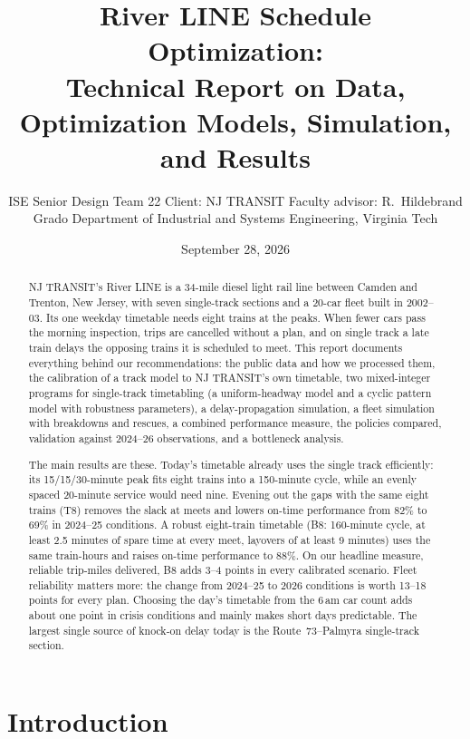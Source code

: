 \documentclass[11pt]{article}
\title{River LINE Schedule Optimization:\\
\large Technical Report on Data, Optimization Models, Simulation, and Results}
\author{ISE Senior Design Team 22 \quad Client: NJ TRANSIT \quad Faculty advisor: R.~Hildebrand\\
Grado Department of Industrial and Systems Engineering, Virginia Tech}
\date{September 28, 2026}
\begin{document}
\maketitle

\begin{abstract}
NJ TRANSIT's River LINE is a 34-mile diesel light rail line between Camden and Trenton, New Jersey, with seven single-track sections and a 20-car fleet built in 2002--03. Its one weekday timetable needs eight trains at the peaks. When fewer cars pass the morning inspection, trips are cancelled without a plan, and on single track a late train delays the opposing trains it is scheduled to meet. This report documents everything behind our recommendations: the public data and how we processed them, the calibration of a track model to NJ TRANSIT's own timetable, two mixed-integer programs for single-track timetabling (a uniform-headway model and a cyclic pattern model with robustness parameters), a delay-propagation simulation, a fleet simulation with breakdowns and rescues, a combined performance measure, the policies compared, validation against 2024--26 observations, and a bottleneck analysis.

The main results are these. Today's timetable already uses the single track efficiently: its 15/15/30-minute peak fits eight trains into a 150-minute cycle, while an evenly spaced 20-minute service would need nine. Evening out the gaps with the same eight trains (T8) removes the slack at meets and lowers on-time performance from 82\% to 69\% in 2024--25 conditions. A robust eight-train timetable (B8: 160-minute cycle, at least 2.5 minutes of spare time at every meet, layovers of at least 9 minutes) uses the same train-hours and raises on-time performance to 88\%. On our headline measure, reliable trip-miles delivered, B8 adds 3--4 points in every calibrated scenario. Fleet reliability matters more: the change from 2024--25 to 2026 conditions is worth 13--18 points for every plan. Choosing the day's timetable from the 6\,am car count adds about one point in crisis conditions and mainly makes short days predictable. The largest single source of knock-on delay today is the Route~73--Palmyra single-track section.
\end{abstract}

\tableofcontents
\newpage

\section{Introduction}\label{sec:intro}
\end{document}
